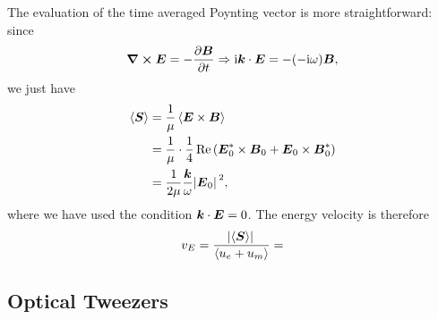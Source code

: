 \documentclass[hyperref, a4paper]{article}
\newcommand*{\ii}{\mathrm{i}}
\begin{document}
The evaluation of the time averaged Poynting vector is more straightforward:
since 
\begin{equation}
    \curl{\vb*{E}} = - \pdv{\vb*{B}}{t} \Rightarrow
    \ii \vb*{k} \cdot \vb*{E} = - (- \ii \omega) \vb*{B},
\end{equation}
we just have 
\begin{equation}
    \begin{aligned}
        \expval{\vb*{S}} &= \frac{1}{\mu} \expval{\vb*{E} \times \vb*{B}} \\
        &= \frac{1}{\mu} \cdot \frac{1}{4} \Re \left(
            \vb*{E}^*_0 \times \vb*{B}_0 + \vb*{E}_0 \times \vb*{B}^*_0 
        \right) \\
        &= \frac{1}{2 \mu} \frac{\vb*{k}}{\omega} \abs*{\vb*{E}_0}^2,
    \end{aligned}
\end{equation}
where we have used the condition $\vb*{k} \cdot \vb*{E} = 0$.
The energy velocity is therefore 
\begin{equation}
    v_{E} = \frac{\abs*{\expval{\vb*{S}}}}{\expval{u_e + u_m}}
    = 
\end{equation}

\subsection{Optical Tweezers}

\todo{}
\end{document}
